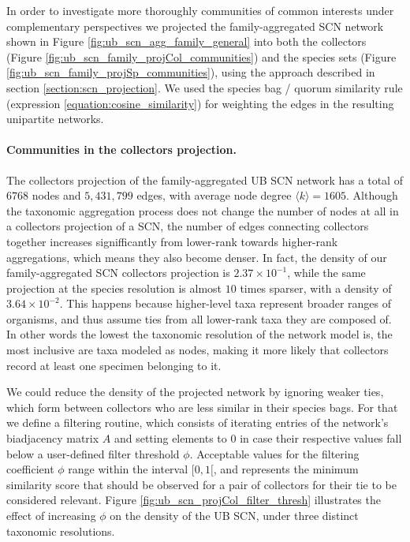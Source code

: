 In order to investigate more thoroughly communities of common interests under complementary perspectives we projected the family-aggregated SCN network shown in Figure \ref{fig:ub_scn_agg_family_general} into both the collectors (Figure \ref{fig:ub_scn_family_projCol_communities}) and the species sets (Figure \ref{fig:ub_scn_family_projSp_communities}), using the approach described in section \ref{section:scn_projection}.
We used the species bag / quorum similarity rule (expression \ref{equation:cosine_similarity}) for weighting the edges in the resulting unipartite networks.


\paragraph*{Communities in the collectors projection.}
The collectors projection of the family-aggregated UB SCN network has a total of $6768$ nodes and $5,431,799$ edges, with average node degree $\langle k \rangle = 1605$.
Although the taxonomic aggregation process does not change the number of nodes at all in a collectors projection of a SCN, the number of edges connecting collectors together increases signifficantly from lower-rank towards higher-rank aggregations, which means they also become denser.
In fact, the density of our family-aggregated SCN collectors projection is $2.37 \times 10^{-1}$, while the same projection at the species resolution is almost $10$ times sparser, with a density of $3.64 \times 10^{-2}$. 
This happens because higher-level taxa represent broader ranges of organisms, and thus assume ties from all lower-rank taxa they are composed of.
In other words the lowest the taxonomic resolution of the network model is, the most inclusive are taxa modeled as nodes, making it more likely that collectors record at least one specimen belonging to it. 

We could reduce the density of the projected network by ignoring weaker ties, which form between collectors who are less similar in their species bags.
For that we define a filtering routine, which consists of iterating entries of the network's biadjacency matrix $A$ and setting elements to $0$ in case their respective values fall below a user-defined filter threshold $\phi$.
Acceptable values for the filtering coefficient $\phi$ range within the interval $[0,1[$, and represents the minimum similarity score that should be observed for a pair of collectors for their tie to be considered relevant.
Figure \ref{fig:ub_scn_projCol_filter_thresh} illustrates the effect of increasing $\phi$ on the density of the UB SCN, under three distinct taxonomic resolutions. 

